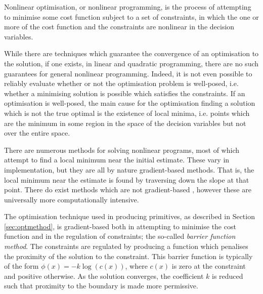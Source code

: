 Nonlinear optimisation, or nonlinear programming, is the process of attempting to minimise some cost function subject to a set of constraints, in which the one or more of the cost function and the constraints are nonlinear in the decision variables. 

While there are techniques which guarantee the convergence of an optimisation to the solution, if one exists, in linear and quadratic programming, there are no such guarantees for general nonlinear programming. Indeed, it is not even possible to reliably evaluate whether or not the optimisation problem is well-posed, i.e. whether a minimising solution is possible which satisfies the constraints. If an optimisation is well-posed, the main cause for the optimisation finding a solution which is not the true optimal is the existence of local minima, i.e. points which are the minimum in some region in the space of the decision variables but not over the entire space.

There are numerous methods for solving nonlinear programs, most of which attempt to find a local minimum near the initial estimate. These vary in implementation, but they are all by nature gradient-based methods. That is, the local minimum near the estimate is found by traversing down the slope at that point. There do exist methods which are not gradient-based \cite{perez2007particle, li2005multi}, however these are universally more computationally intensive.

The optimisation technique used in producing primitives, as described in Section \ref{sec:optmethod}, is gradient-based both in attempting to minimise the cost function and in the regulation of constraints; the so-called \textit{barrier function method}. The constraints are regulated by producing a function which penalises the proximity of the solution to the constraint. This barrier function is typically of the form $\phi(x)=-k\log(c(x))$, where $c(x)$ is zero at the constraint and positive otherwise. As the solution converges, the coefficient $k$ is reduced such that proximity to the boundary is made more permissive.